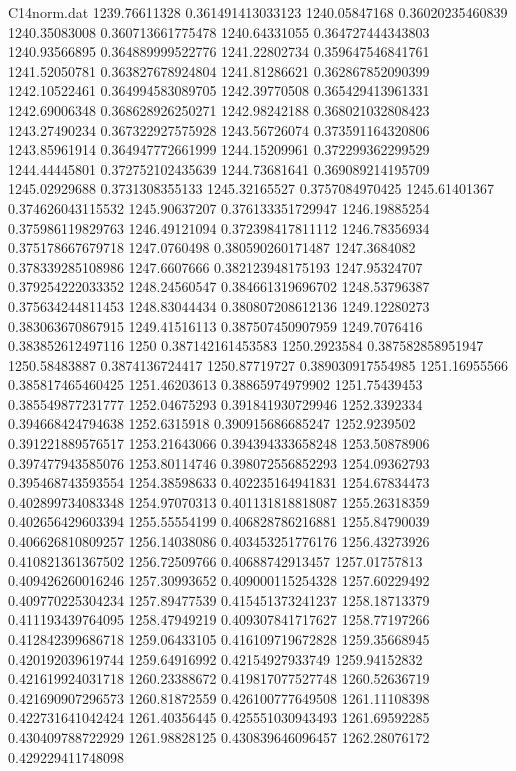 \begin{filecontents}{C14norm.dat}
1239.76611328			0.361491413033123
1240.05847168			0.36020235460839
1240.35083008			0.360713661775478
1240.64331055			0.364727444343803
1240.93566895			0.364889999522776
1241.22802734			0.359647546841761
1241.52050781			0.363827678924804
1241.81286621			0.362867852090399
1242.10522461			0.364994583089705
1242.39770508			0.365429413961331
1242.69006348			0.368628926250271
1242.98242188			0.368021032808423
1243.27490234			0.367322927575928
1243.56726074			0.373591164320806
1243.85961914			0.364947772661999
1244.15209961			0.372299362299529
1244.44445801			0.372752102435639
1244.73681641			0.369089214195709
1245.02929688			0.3731308355133
1245.32165527			0.3757084970425
1245.61401367			0.374626043115532
1245.90637207			0.376133351729947
1246.19885254			0.375986119829763
1246.49121094			0.372398417811112
1246.78356934			0.375178667679718
1247.0760498			0.380590260171487
1247.3684082			0.378339285108986
1247.6607666			0.382123948175193
1247.95324707			0.379254222033352
1248.24560547			0.384661319696702
1248.53796387			0.375634244811453
1248.83044434			0.380807208612136
1249.12280273			0.383063670867915
1249.41516113			0.387507450907959
1249.7076416			0.383852612497116
1250			0.387142161453583
1250.2923584			0.387582858951947
1250.58483887			0.3874136724417
1250.87719727			0.389030917554985
1251.16955566			0.385817465460425
1251.46203613			0.38865974979902
1251.75439453			0.385549877231777
1252.04675293			0.391841930729946
1252.3392334			0.394668424794638
1252.6315918			0.390915686685247
1252.9239502			0.391221889576517
1253.21643066			0.394394333658248
1253.50878906			0.397477943585076
1253.80114746			0.398072556852293
1254.09362793			0.395468743593554
1254.38598633			0.402235164941831
1254.67834473			0.402899734083348
1254.97070313			0.401131818818087
1255.26318359			0.402656429603394
1255.55554199			0.406828786216881
1255.84790039			0.406626810809257
1256.14038086			0.403453251776176
1256.43273926			0.410821361367502
1256.72509766			0.40688742913457
1257.01757813			0.409426260016246
1257.30993652			0.409000115254328
1257.60229492			0.409770225304234
1257.89477539			0.415451373241237
1258.18713379			0.411193439764095
1258.47949219			0.409307841717627
1258.77197266			0.412842399686718
1259.06433105			0.416109719672828
1259.35668945			0.420192039619744
1259.64916992			0.42154927933749
1259.94152832			0.421619924031718
1260.23388672			0.419817077527748
1260.52636719			0.421690907296573
1260.81872559			0.426100777649508
1261.11108398			0.422731641042424
1261.40356445			0.425551030943493
1261.69592285			0.430409788722929
1261.98828125			0.430839646096457
1262.28076172			0.429229411748098

\end{filecontents}
